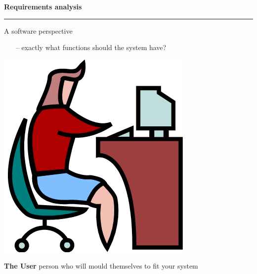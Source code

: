 \documentclass[pdf]{beamer}
\begin{document}
\begin{frame}
\vspace{8mm}
\textcolor{myBlue}{\textbf{\Large{Requirements analysis}}}

\textcolor{red}{\rule{10cm}{1mm}}	

A software perspective
    \begin{itemize}
      \item [--]exactly what functions should the system have?      
    \end{itemize}
    
	\begin{minipage}[t]{0.28\linewidth}  
      \bigskip
      \includegraphics[scale=0.5]{5_Picture5.png}
  	\end{minipage}
\hfill
\begin{minipage}[t]{0.65\linewidth}   
\bigskip
\bigskip
\bigskip
\bigskip
\bigskip
\LARGE \textbf{The User} \newline
\normalsize{person who will mould \newline themselves to fit your system}
\end{minipage}           
\end{frame}
\end{document}

